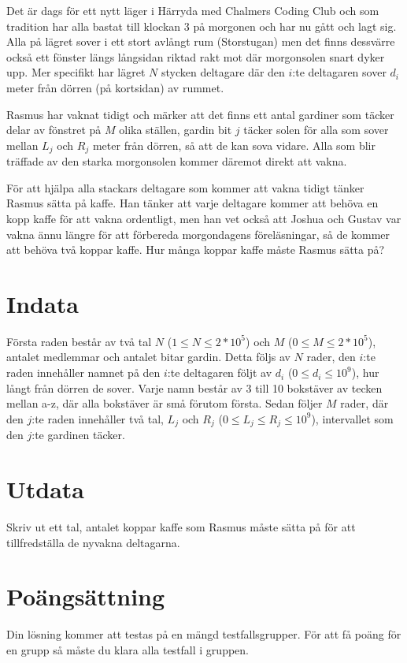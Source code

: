 
Det är dags för ett nytt läger i Härryda med Chalmers Coding Club och som tradition har alla bastat till klockan 3 på
morgonen och har nu gått och lagt sig. Alla på lägret sover i ett stort avlångt rum (Storstugan) men det finns dessvärre
också ett fönster längs långsidan riktad rakt mot där morgonsolen snart dyker upp. Mer specifikt har lägret $N$ stycken
deltagare där den $i$:te deltagaren sover $d_i$ meter från dörren (på kortsidan) av rummet.


Rasmus har vaknat tidigt och märker att det finns ett antal gardiner som täcker delar av fönstret på $M$ olika ställen,
gardin bit $j$ täcker solen för alla som sover mellan $L_j$ och $R_j$ meter från dörren, så att de kan sova vidare. Alla
som blir träffade av den starka morgonsolen kommer däremot direkt att vakna.

För att hjälpa alla stackars deltagare som kommer att vakna tidigt tänker Rasmus sätta på kaffe. Han tänker att varje
deltagare kommer att behöva en kopp kaffe för att vakna ordentligt, men han vet också att Joshua och Gustav
var vakna ännu längre för att förbereda morgondagens föreläsningar, så de kommer att behöva två koppar kaffe. Hur
många koppar kaffe måste Rasmus sätta på?


\section*{Indata}
Första raden består av två tal $N$ ($1 \le N \le 2 * 10^5$) och $M$ ($0 \le M \le 2 * 10^5$), antalet medlemmar och antalet bitar gardin. Detta följs
av $N$ rader, den $i$:te raden innehåller namnet på den $i$:te deltagaren följt av $d_i$ ($0 \le d_i \le 10^9$), hur långt
från dörren de sover. Varje namn består av 3 till 10 bokstäver av tecken mellan a-z, där alla bokstäver är små förutom första.
Sedan följer $M$ rader, där den $j$:te raden innehåller två tal, $L_j$ och $R_j$ ($0 \le L_j \le R_j \le 10^9$),
intervallet som den $j$:te gardinen täcker.

\section*{Utdata}
Skriv ut ett tal, antalet koppar kaffe som Rasmus måste sätta på för att tillfredställa de nyvakna deltagarna.

\section*{Poängsättning}
Din lösning kommer att testas på en mängd testfallsgrupper.
För att få poäng för en grupp så måste du klara alla testfall i gruppen.

